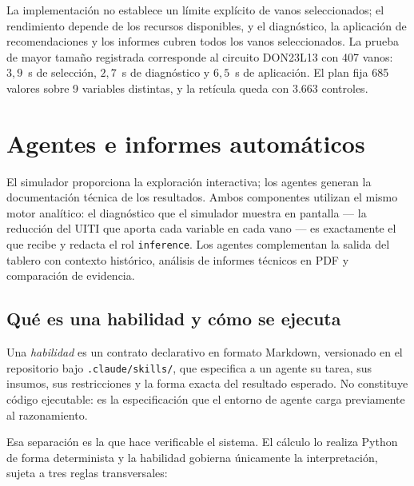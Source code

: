 \documentclass[11pt,a4paper]{article}
\begin{document}
La implementación no establece un límite explícito de vanos seleccionados; el rendimiento
depende de los recursos disponibles, y el diagnóstico, la aplicación de recomendaciones y los
informes cubren todos los vanos seleccionados. La prueba de mayor tamaño registrada corresponde
al circuito DON23L13 con 407 vanos: $3{,}9$~s de selección, $2{,}7$~s de diagnóstico y $6{,}5$~s
de aplicación. El plan fija 685 valores sobre 9 variables distintas, y la retícula queda con
3.663 controles.

\section{Agentes e informes automáticos}
\label{sec:agentes}

El simulador proporciona la exploración interactiva; los agentes generan la documentación
técnica de los resultados. Ambos componentes utilizan el mismo motor analítico: el diagnóstico
que el simulador muestra en pantalla --- la reducción del UITI que aporta cada variable en cada
vano --- es exactamente el que recibe y redacta el rol \texttt{inference}. Los agentes
complementan la salida del tablero con contexto histórico, análisis de informes técnicos en PDF
y comparación de evidencia.

\subsection{Qué es una habilidad y cómo se ejecuta}

Una \emph{habilidad} es un contrato declarativo en formato Markdown, versionado en el
repositorio bajo \texttt{.claude/skills/}, que especifica a un agente su tarea, sus insumos, sus
restricciones y la forma exacta del resultado esperado. No constituye código ejecutable: es la
especificación que el entorno de agente carga previamente al razonamiento.

Esa separación es la que hace verificable el sistema. El cálculo lo realiza Python de forma
determinista y la habilidad gobierna únicamente la interpretación, sujeta a tres reglas
transversales:
\end{document}
